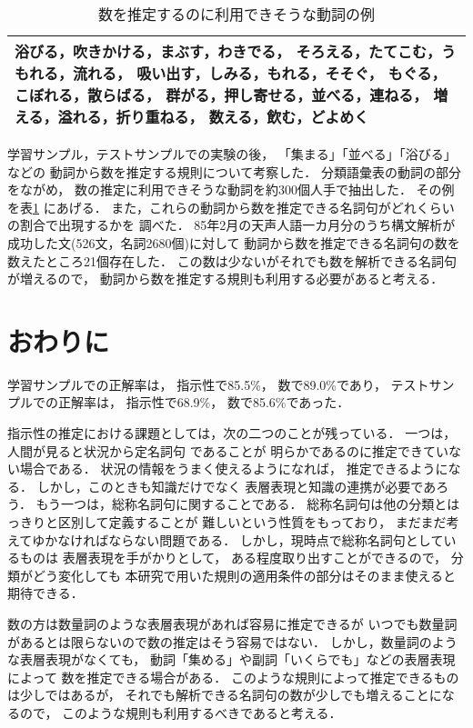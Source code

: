 \begin{table}[t]
\small
  \leavevmode
    \caption{数を推定するのに利用できそうな動詞の例}
  \begin{center}
    \label{tab:num_verb}
\begin{tabular}{|p{13cm}|}\hline
浴びる，吹きかける，まぶす，わきでる，
そろえる，たてこむ，うもれる，流れる，
吸い出す，しみる，もれる，そそぐ，
もぐる，こぼれる，散らばる，
群がる，押し寄せる，並べる，連ねる，
増える，溢れる，折り重ねる，
数える，飲む，どよめく\\\hline
\end{tabular}
\end{center}
\end{table}

学習サンプル，テストサンプルでの実験の後，
「集まる」「並べる」「浴びる」などの
動詞から数を推定する規則について考察した．
分類語彙表の動詞の部分をながめ，
数の推定に利用できそうな動詞を約300個人手で抽出した．
その例を表\ref{tab:num_verb} にあげる．
また，これらの動詞から数を推定できる名詞句がどれくらいの割合で出現するかを
調べた．
85年2月の天声人語一カ月分のうち構文解析が成功した文(526文，名詞2680個)に対して
動詞から数を推定できる名詞句の数を数えたところ21個存在した．
この数は少ないがそれでも数を解析できる名詞句が増えるので，
動詞から数を推定する規則も利用する必要があると考える．

\section{おわりに}\label{sec:end}

学習サンプルでの正解率は，
指示性で85.5\%，
数で89.0\%であり，
テストサンプルでの正解率は，
指示性で68.9\%，
数で85.6\%であった．

指示性の推定における課題としては，次の二つのことが残っている．
一つは，人間が見ると状況から定名詞句
であることが
明らかであるのに推定できていない場合である．
状況の情報をうまく使えるようになれば，
推定できるようになる．
しかし，このときも知識だけでなく
表層表現と知識の連携が必要であろう．
もう一つは，総称名詞句に関することである．
総称名詞句は他の分類とはっきりと区別して定義することが
難しいという性質をもっており，
まだまだ考えてゆかなければならない問題である．
しかし，現時点で総称名詞句としているものは
表層表現を手がかりとして，
ある程度取り出すことができるので，
分類がどう変化しても
本研究で用いた規則の適用条件の部分はそのまま使えると期待できる．

数の方は数量詞のような表層表現があれば容易に推定できるが
いつでも数量詞があるとは限らないので数の推定はそう容易ではない．
しかし，数量詞のような表層表現がなくても，
動詞「集める」や副詞「いくらでも」などの表層表現によって
数を推定できる場合がある．
このような規則によって推定できるものは少しではあるが，
それでも解析できる名詞句の数が少しでも増えることになるので，
このような規則も利用するべきであると考える．


